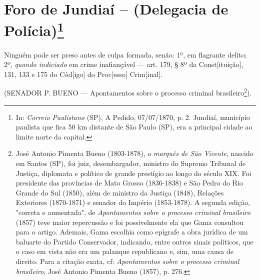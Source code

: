 \chapter{Foro de Jundiaí -- (Delegacia de Polícia)\footnote[*]{In: \emph{Correio Paulistano} (SP), A Pedido,
  07/07/1870, p. 2. Jundiaí, município paulista que fica 50 km distante
  de São Paulo (SP), era a principal cidade ao limite norte da capital.}}


Ninguém pode ser preso antes de culpa formada, senão: 1º, em flagrante
delito; 2º, \emph{quando indiciado} em crime inafiançável --- art. 179,
§ 8º da Const{[}ituição{]}, 131, 133 e 175 do Cód{[}igo{]} do
Proc{[}esso{]} Crim{[}inal{]}.

(SENADOR P. BUENO --- Apontamentos sobre o processo criminal
brasileiro\footnote{José Antonio Pimenta Bueno (1803-1878), o
  \emph{marquês de São Vicente}, nascido em Santos (SP), foi juiz,
  desembargador, ministro do Supremo Tribunal de Justiça, diplomata e
  político de grande prestígio ao longo do século XIX. Foi presidente
  das províncias de Mato Grosso (1836-1838) e São Pedro do Rio Grande do
  Sul (1850), além de ministro da Justiça (1848), Relações Exteriores
  (1870-1871) e senador do Império (1853-1878). A segunda edição,
  "correta e aumentada", de \emph{Apontamentos sobre o processo criminal
  brasileiro} (1857) teve maior repercussão e foi possivelmente ela que
  Gama consultou para o artigo. Ademais, Gama escolhia como epígrafe a
  obra jurídica de um baluarte do Partido Conservador, indicando, entre
  outros sinais políticos, que o caso em vista não era um palanque
  republicano e, sim, uma causa de direito. Para a citação exata, cf:
  \emph{Apontamentos sobre o processo criminal brasileiro}, José Antonio
  Pimenta Bueno (1857), p. 276.}).

